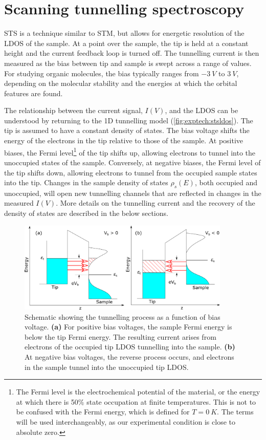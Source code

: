 \section{Scanning tunnelling spectroscopy}
\label{sec:exptech:sts}

\Acf{STS} is a technique similar to \ac{STM}, but allows for energetic resolution of the \ac{LDOS} of the sample. At a point over the sample, the tip is held at a constant height and the current feedback loop is turned off. The tunnelling current is then measured as the bias between tip and sample is swept across a range of values. For studying organic molecules, the bias typically ranges from $\SI{-3}{V}$ to $\SI{3}{V}$, depending on the molecular stability and the energies at which the orbital features are found.

The relationship between the current signal, $I(V)$, and the \ac{LDOS} can be understood by returning to the \ac{1D} tunnelling model (\autoref{fig:exptech:stsldos}). The tip is assumed to have a constant density of states. The bias voltage shifts the energy of the electrons in the tip relative to those of the sample. At positive biases, the Fermi level\footnote{The Fermi level is the electrochemical potential of the material, or the energy at which there is 50\% state occupation at finite temperatures. This is not to be confused with the Fermi energy, which is defined for $T=\SI{0}{K}$. The terms will be used interchangeably, as our experimental condition is close to absolute zero.} of the tip shifts up, allowing electrons to tunnel into the unoccupied states of the sample. Conversely, at negative biases, the Fermi level of the tip shifts down, allowing electrons to tunnel from the occupied sample states into the tip. Changes in the sample density of states $\rho_s(E)$, both occupied and unoccupied, will open new tunnelling channels that are reflected in changes in the measured $I(V)$. More details on the tunnelling current and the recovery of the density of states are described in the below sections.

\begin{figure} [h]
    \centering
    \includegraphics[width=0.9\textwidth]{pictures/sts_ldos.png}
    \caption{Schematic showing the tunnelling process as a function of bias voltage. \textbf{(a)} For positive bias voltages, the sample Fermi energy is below the tip Fermi energy. The resulting current arises from electrons of the occupied tip LDOS tunnelling into the sample. \textbf{(b)} At negative bias voltages, the reverse process occurs, and electrons in the sample tunnel into the unoccupied tip LDOS.}
    \label{fig:exptech:stsldos}
\end{figure}

